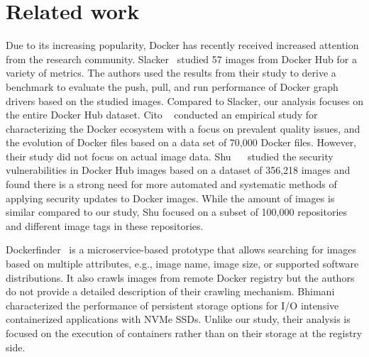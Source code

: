 \section{Related work}
\label{sec:related}


Due to its increasing popularity, Docker has recently received increased
attention from the research community.
%
Slacker~\cite{slacker} studied 57 images from Docker Hub for a variety of metrics.
The authors used the results from their study to derive a benchmark to evaluate
the push, pull, and run performance of Docker graph drivers based on the studied
images. Compared to Slacker, our analysis focuses on the entire Docker Hub dataset.
%
Cito \etal~\cite{analysisdockergithub} conducted an empirical study for characterizing
the Docker ecosystem with a focus on prevalent quality issues, and the evolution of Docker 
files based on a data set of 70,000 Docker files. However, their study did not focus
on actual image data.
%
Shu \etal~~\cite{dockervulnerabile} studied the security vulnerabilities in Docker Hub
images based on a dataset of 356,218 images and found there is a strong need for more
automated and systematic methods of applying security updates to Docker images. While
the amount of images is similar compared to our study, Shu \etal focused on a subset
of 100,000 repositories and different image tags in these repositories.

Dockerfinder~\cite{dockerfinder} is a microservice-based prototype that allows searching
for images based on  multiple attributes, e.g., image name, image size, or supported software 
distributions. It also crawls images from remote Docker registry but the authors do
not provide a detailed description of their crawling mechanism.
%
Bhimani~\cite{dockerssd} \etal characterized the performance of persistent storage options
for I/O intensive containerized applications with NVMe SSDs. Unlike our study, their analysis
is focused on the execution of containers rather than on their storage at the registry side.

